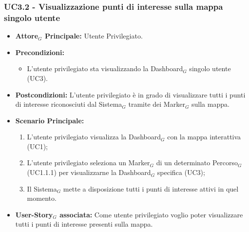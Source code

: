 \documentclass[10pt]{article}
\begin{document}
\begin{justify}
\subsubsection{\textbf{UC3.2 - Visualizzazione punti di interesse sulla mappa singolo utente}}
\label{UC3.2}
\begin{itemize}
     \item \textbf{Attore$_G$ Principale:} Utente Privilegiato.
     \item \textbf{Precondizioni:}
        \begin{itemize}
    		\item L'utente privilegiato sta visualizzando la Dashboard$_G$ singolo utente (UC3).
        \end{itemize}
     \item \textbf{Postcondizioni:} L'utente privilegiato è in grado di visualizzare tutti i punti di interesse riconosciuti dal Sistema$_G$ tramite dei Marker$_G$ sulla mappa.
     \item \textbf{Scenario Principale:}
        \begin{enumerate}
            \item L'utente privilegiato visualizza la Dashboard$_G$ con la mappa interattiva (UC1);
            \item L'utente privilegiato seleziona un Marker$_G$ di un determinato Percorso$_G$ (UC1.1.1) per visualizzarne la Dashboard$_G$ specifica (UC3);
            \item Il Sistema$_G$ mette a disposizione tutti i punti di interesse attivi in quel momento.
        \end{enumerate}
     \item \textbf{User-Story$_G$ associata:}
     Come utente privilegiato voglio poter visualizzare tutti i punti di interesse presenti sulla mappa.
\end{itemize}

\end{justify}
\end{document}
